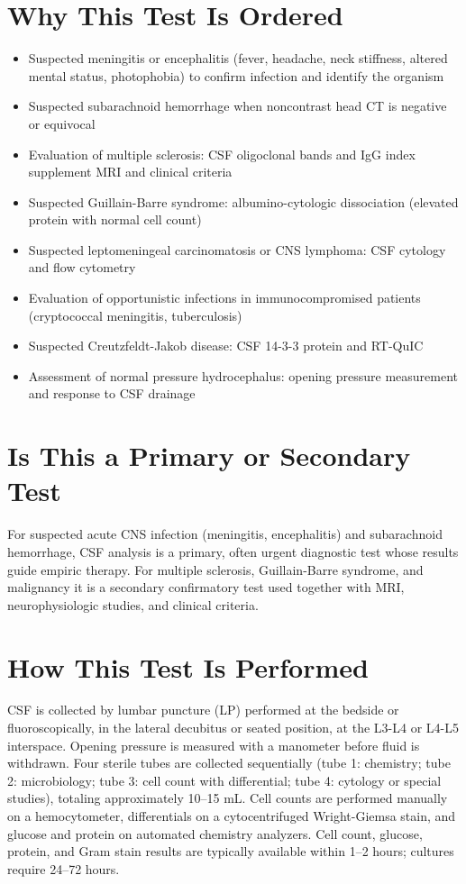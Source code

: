 \section*{Why This Test Is Ordered}
\begin{itemize}
  \item Suspected meningitis or encephalitis (fever, headache, neck stiffness, altered mental status, photophobia) to confirm infection and identify the organism
  \item Suspected subarachnoid hemorrhage when noncontrast head CT is negative or equivocal
  \item Evaluation of multiple sclerosis: CSF oligoclonal bands and IgG index supplement MRI and clinical criteria
  \item Suspected Guillain-Barre syndrome: albumino-cytologic dissociation (elevated protein with normal cell count)
  \item Suspected leptomeningeal carcinomatosis or CNS lymphoma: CSF cytology and flow cytometry
  \item Evaluation of opportunistic infections in immunocompromised patients (cryptococcal meningitis, tuberculosis)
  \item Suspected Creutzfeldt-Jakob disease: CSF 14-3-3 protein and RT-QuIC
  \item Assessment of normal pressure hydrocephalus: opening pressure measurement and response to CSF drainage
\end{itemize}
\section*{Is This a Primary or Secondary Test}
For suspected acute CNS infection (meningitis, encephalitis) and subarachnoid hemorrhage, CSF analysis is a primary, often urgent diagnostic test whose results guide empiric therapy. For multiple sclerosis, Guillain-Barre syndrome, and malignancy it is a secondary confirmatory test used together with MRI, neurophysiologic studies, and clinical criteria.
\section*{How This Test Is Performed}
CSF is collected by lumbar puncture (LP) performed at the bedside or fluoroscopically, in the lateral decubitus or seated position, at the L3-L4 or L4-L5 interspace. Opening pressure is measured with a manometer before fluid is withdrawn. Four sterile tubes are collected sequentially (tube 1: chemistry; tube 2: microbiology; tube 3: cell count with differential; tube 4: cytology or special studies), totaling approximately 10--15 mL. Cell counts are performed manually on a hemocytometer, differentials on a cytocentrifuged Wright-Giemsa stain, and glucose and protein on automated chemistry analyzers. Cell count, glucose, protein, and Gram stain results are typically available within 1--2 hours; cultures require 24--72 hours.
